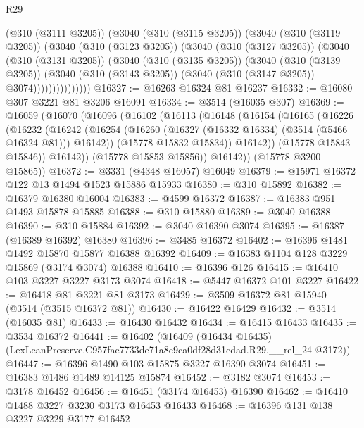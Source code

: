 \begin{lexlean}{R29}
\begin{coremodule}
                (@310 (@3111 @3205))
                (@3040
                  (@310 (@3115 @3205))
                  (@3040
                    (@310 (@3119 @3205))
                    (@3040
                      (@310 (@3123 @3205))
                      (@3040
                        (@310 (@3127 @3205))
                        (@3040
                          (@310 (@3131 @3205))
                          (@3040
                            (@310 (@3135 @3205))
                            (@3040
                              (@310 (@3139 @3205))
                              (@3040
                                (@310 (@3143 @3205))
                                (@3040 (@310 (@3147 @3205)) @3074)))))))))))))))
@16327 := @16263 @16324 @81 @16237
@16332 := @16080 @307 @3221 @81 @3206 @16091
@16334 := @3514 (@16035 @307)
@16369 := @16059
    (@16070
      (@16096
        (@16102
          (@16113
            (@16148
              (@16154
                (@16165
                  (@16226
                    (@16232
                      (@16242
                        (@16254 (@16260 (@16327 (@16332 @16334) (@3514 (@5466 @16324 @81))) @16142))
                        (@15778 @15832 @15834))
                      @16142))
                  (@15778 @15843 @15846))
                @16142))
            (@15778 @15853 @15856))
          @16142))
      (@15778 @3200 @15865))
@16372 := @3331 (@4348 @16057) @16049
@16379 := @15971 @16372 @122 @13 @1494 @1523 @15886 @15933
@16380 := @310 @15892
@16382 := @16379 @16380 @16004
@16383 := @4599 @16372
@16387 := @16383 @951 @1493 @15878 @15885
@16388 := @310 @15880
@16389 := @3040 @16388
@16390 := @310 @15884
@16392 := @3040 @16390 @3074
@16395 := @16387 (@16389 @16392) @16380
@16396 := @3485 @16372
@16402 := @16396 @1481 @1492 @15870 @15877 @16388 @16392
@16409 := @16383 @1104 @128 @3229 @15869 (@3174 @3074) @16388
@16410 := @16396 @126
@16415 := @16410 @103 @3227 @3227 @3173 @3074
@16418 := @5447 @16372 @101 @3227
@16422 := @16418 @81 @3221 @81 @3173
@16429 := @3509 @16372 @81 @15940 (@3514 (@3515 @16372 @81))
@16430 := @16422 @16429
@16432 := @3514 (@16035 @81)
@16433 := @16430 @16432
@16434 := @16415 @16433
@16435 := @3534 @16372
@16441 := @16402
    (@16409 (@16434 @16435) (LexLeanPreserve.C957fae7733de71a8e9ca0df28d31cdad.R29.__rel_24 @3172))
@16447 := @16396 @1490 @103 @15875 @3227 @16390 @3074
@16451 := @16383 @1486 @1489 @14125 @15874
@16452 := @3182 @3074
@16453 := @3178 @16452
@16456 := @16451 (@3174 @16453) @16390
@16462 := @16410 @1488 @3227 @3230 @3173 @16453 @16433
@16468 := @16396 @131 @138 @3227 @3229 @3177 @16452

\end{coremodule}
\end{lexlean}

